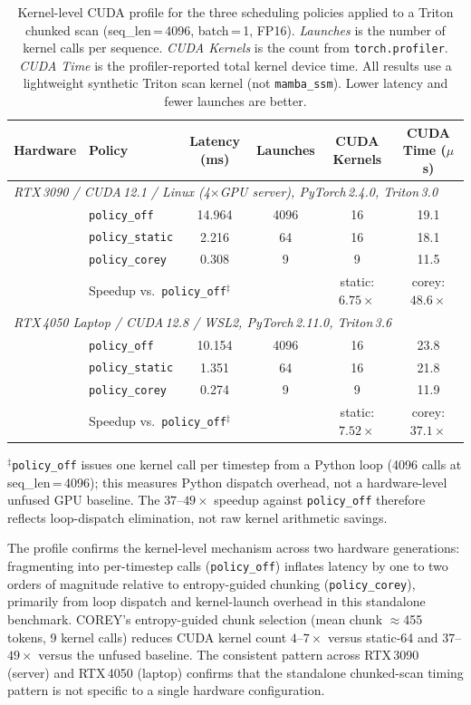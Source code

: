 \begin{table}[!t]
\centering
\caption{Kernel-level CUDA profile for the three scheduling policies applied to a Triton chunked scan (seq\_len\,=\,4096, batch\,=\,1, FP16). \emph{Launches} is the number of kernel calls per sequence. \emph{CUDA Kernels} is the count from \texttt{torch.profiler}. \emph{CUDA Time} is the profiler-reported total kernel device time. All results use a lightweight synthetic Triton scan kernel (not \texttt{mamba\_ssm}). Lower latency and fewer launches are better.}
\label{tab:cuda_kernel_profile}
\small
\begin{tabular}{llcccc}
\toprule
Hardware & Policy & Latency (ms) & Launches & CUDA Kernels & CUDA Time ($\mu$s) \\
\midrule
\multicolumn{6}{l}{\textit{RTX\,3090 / CUDA\,12.1 / Linux (4$\times$GPU server), PyTorch\,2.4.0, Triton\,3.0}} \\
 & \texttt{policy\_off}    & 14.964 & 4096 & 16 & 19.1 \\
 & \texttt{policy\_static} &  2.216 &   64 & 16 & 18.1 \\
 & \texttt{policy\_corey}  &  0.308 &    9 &  9 & 11.5 \\
 & \multicolumn{2}{l}{Speedup vs.\ \texttt{policy\_off}$^\ddagger$} & & static: $6.75\times$ & corey: $48.6\times$ \\
\midrule
\multicolumn{6}{l}{\textit{RTX\,4050 Laptop / CUDA\,12.8 / WSL2, PyTorch\,2.11.0, Triton\,3.6}} \\
 & \texttt{policy\_off}    & 10.154 & 4096 & 16 & 23.8 \\
 & \texttt{policy\_static} &  1.351 &   64 & 16 & 21.8 \\
 & \texttt{policy\_corey}  &  0.274 &    9 &  9 & 11.9 \\
 & \multicolumn{2}{l}{Speedup vs.\ \texttt{policy\_off}$^\ddagger$} & & static: $7.52\times$ & corey: $37.1\times$ \\
\bottomrule
\end{tabular}
\end{table}

\noindent
$^\ddagger$\texttt{policy\_off} issues one kernel call per timestep from a Python loop (4096 calls at seq\_len\,=\,4096); this measures Python dispatch overhead, not a hardware-level unfused GPU baseline. The $37$--$49\times$ speedup against \texttt{policy\_off} therefore reflects loop-dispatch elimination, not raw kernel arithmetic savings.

The profile confirms the kernel-level mechanism across two hardware generations: fragmenting into per-timestep calls (\texttt{policy\_off}) inflates latency by one to two orders of magnitude relative to entropy-guided chunking (\texttt{policy\_corey}), primarily from loop dispatch and kernel-launch overhead in this standalone benchmark.
COREY's entropy-guided chunk selection (mean chunk $\approx$455 tokens, 9 kernel calls) reduces CUDA kernel count $4$--$7\times$ versus static-64 and $37$--$49\times$ versus the unfused baseline.
The consistent pattern across RTX\,3090 (server) and RTX\,4050 (laptop) confirms that the standalone chunked-scan timing pattern is not specific to a single hardware configuration.

